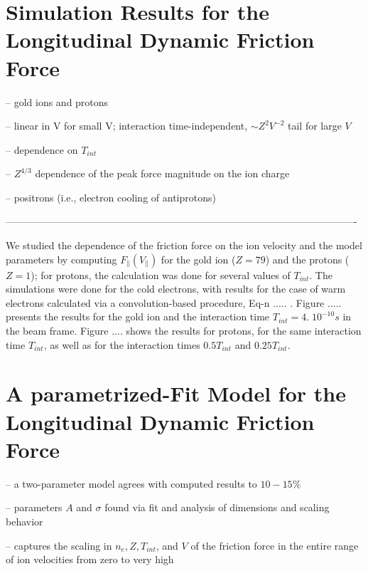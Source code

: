 \documentclass[12pt, reqno]{amsart}
\begin{document}
\section{Simulation Results for the Longitudinal Dynamic Friction Force}

-- gold ions and protons 


-- linear in V for small V;  interaction time-independent,  $\sim Z^2 V^{-2} $ tail for large $V$ 

-- dependence on $T_{int}$ 

-- $Z^{4/3}$ dependence of the peak force magnitude on the ion charge  

-- positrons (i.e., electron cooling of antiprotons) 

---------------------------------------------------------------------------------------------------------- 

We studied the dependence of the friction force on the ion velocity and the model parameters by computing $F_{\parallel}(V_{\parallel})$ for the gold ion ($Z = 79$) and the protons ($Z = 1$); for protons, the calculation was done for several values of $T_{int}$.  The simulations were done for the cold electrons, with results for the case of warm electrons calculated via a convolution-based procedure, Eq-n ..... .  Figure ..... presents the results for the gold ion and the interaction time $T_{int} = 4. \; 10^{-10} s$ in the beam frame.  Figure .... shows the results for protons, for the same interaction time $T_{int}$, as well as for the interaction times $0.5T_{int}$ and $0.25T_{int}$. 



\section{A parametrized-Fit Model for the Longitudinal Dynamic Friction Force}

-- a two-parameter model agrees with computed results to $10-15\%$ 

-- parameters $A$ and $\sigma$ found via fit and analysis of dimensions and scaling behavior 

-- captures the scaling in $n_e, Z, T_{int}$, and $V$ of the friction force in the entire range of ion velocities from zero to very high 
\end{document}
